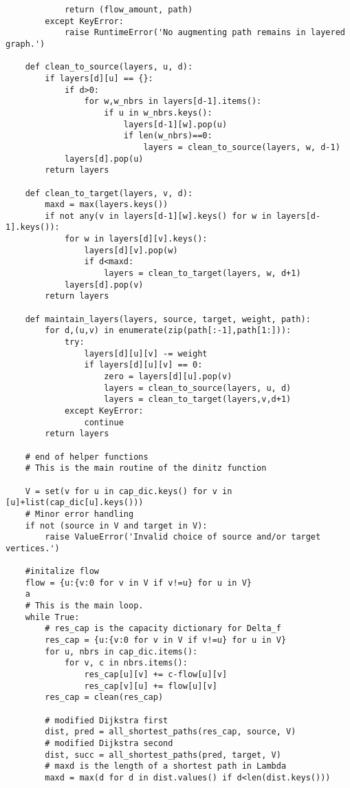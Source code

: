 \documentclass[m3380-lec-main.tex]{subfiles}
\begin{document}
\begin{verbatim}
            return (flow_amount, path)
        except KeyError:
            raise RuntimeError('No augmenting path remains in layered graph.')
            
    def clean_to_source(layers, u, d):
        if layers[d][u] == {}:
            if d>0:
                for w,w_nbrs in layers[d-1].items():
                    if u in w_nbrs.keys():
                        layers[d-1][w].pop(u)
                        if len(w_nbrs)==0:
                            layers = clean_to_source(layers, w, d-1)
            layers[d].pop(u)
        return layers
    
    def clean_to_target(layers, v, d):
        maxd = max(layers.keys())
        if not any(v in layers[d-1][w].keys() for w in layers[d-1].keys()):
            for w in layers[d][v].keys():
                layers[d][v].pop(w)
                if d<maxd:
                    layers = clean_to_target(layers, w, d+1)
            layers[d].pop(v)
        return layers

    def maintain_layers(layers, source, target, weight, path):
        for d,(u,v) in enumerate(zip(path[:-1],path[1:])):
            try:
                layers[d][u][v] -= weight
                if layers[d][u][v] == 0:
                    zero = layers[d][u].pop(v)
                    layers = clean_to_source(layers, u, d)
                    layers = clean_to_target(layers,v,d+1)
            except KeyError:
                continue
        return layers
    
    # end of helper functions
    # This is the main routine of the dinitz function
    
    V = set(v for u in cap_dic.keys() for v in [u]+list(cap_dic[u].keys()))
    # Minor error handling
    if not (source in V and target in V):
        raise ValueError('Invalid choice of source and/or target vertices.')
        
    #initalize flow
    flow = {u:{v:0 for v in V if v!=u} for u in V}
    a
    # This is the main loop.
    while True:
        # res_cap is the capacity dictionary for Delta_f
        res_cap = {u:{v:0 for v in V if v!=u} for u in V}
        for u, nbrs in cap_dic.items():
            for v, c in nbrs.items():
                res_cap[u][v] += c-flow[u][v]
                res_cap[v][u] += flow[u][v]
        res_cap = clean(res_cap)
        
        # modified Dijkstra first
        dist, pred = all_shortest_paths(res_cap, source, V)
        # modified Dijkstra second
        dist, succ = all_shortest_paths(pred, target, V)
        # maxd is the length of a shortest path in Lambda
        maxd = max(d for d in dist.values() if d<len(dist.keys()))


\end{verbatim}
\end{document}
